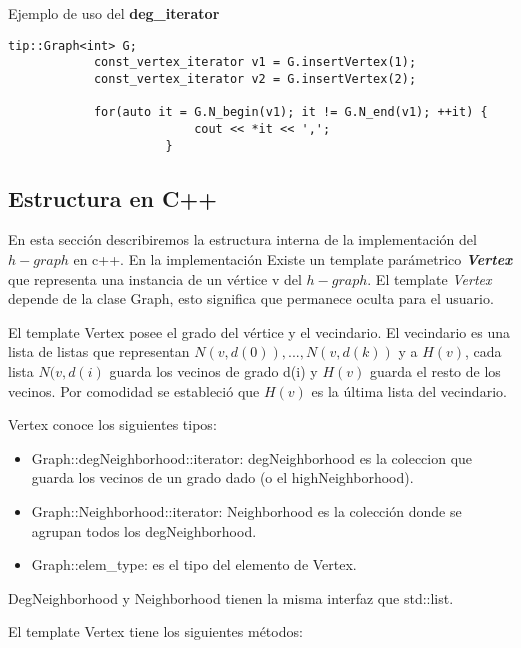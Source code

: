 \documentclass[a4paper,12pt]{article}
\begin{document}
                        Ejemplo de uso del \textbf{deg\_iterator}
\textit{}
            \begin{lstlisting}[frame=single]
            tip::Graph<int> G;
            const_vertex_iterator v1 = G.insertVertex(1);
            const_vertex_iterator v2 = G.insertVertex(2);

            for(auto it = G.N_begin(v1); it != G.N_end(v1); ++it) {
                          cout << *it << ',';
                      }
            \end{lstlisting}



\subsection{Estructura en C++}
En esta sección describiremos la estructura interna de la implementación del $h-graph$ en c++.
En la implementación Existe un template parámetrico \textbf{\textit{Vertex}} que representa una instancia de un vértice v del $h-graph$.  El template \textit{Vertex} depende de la clase Graph, esto significa que permanece oculta para el usuario.

El template Vertex posee el grado del vértice y el vecindario. El vecindario es una lista de listas que representan $N(v, d(0)), ..., N(v, d(k))$ y a $H(v)$, cada lista $N(v, d(i)$ guarda los vecinos de grado d(i) y $H(v)$ guarda el resto de los vecinos. Por comodidad se estableció que $H(v)$ es la última lista del vecindario.


Vertex conoce los siguientes tipos:

\begin{itemize}
\item Graph::degNeighborhood::iterator: degNeighborhood es la coleccion que guarda los vecinos de un grado dado (o el highNeighborhood).
   
\item Graph::Neighborhood::iterator: Neighborhood es la colección donde se agrupan todos los degNeighborhood.

\item Graph::elem\_type: es el tipo del elemento de Vertex.
\end{itemize}


DegNeighborhood y Neighborhood tienen la misma interfaz que std::list.


El template Vertex tiene los siguientes métodos:
\end{document}

